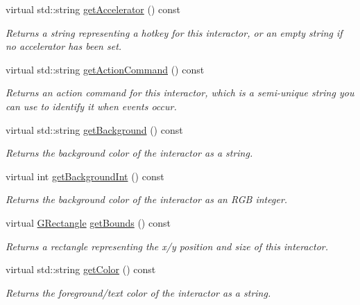 \begin{DoxyCompactItemize}
virtual std\+::string \mbox{\hyperlink{classGInteractor_a69f8d23ed8f207fbecad99960776e942}{get\+Accelerator}} () const
\begin{DoxyCompactList}\small\item\em Returns a string representing a hotkey for this interactor, or an empty string if no accelerator has been set. \end{DoxyCompactList}\item 
virtual std\+::string \mbox{\hyperlink{classGInteractor_a94eb4276000c4fdfb508ce9e6317a82a}{get\+Action\+Command}} () const
\begin{DoxyCompactList}\small\item\em Returns an action command for this interactor, which is a semi-\/unique string you can use to identify it when events occur. \end{DoxyCompactList}\item 
virtual std\+::string \mbox{\hyperlink{classGInteractor_a808e22cc1fdfbecf71ed8c64ef4600e0}{get\+Background}} () const
\begin{DoxyCompactList}\small\item\em Returns the background color of the interactor as a string. \end{DoxyCompactList}\item 
virtual int \mbox{\hyperlink{classGInteractor_a9e827257a55cb8cf4d9de2ec6bcfd7a0}{get\+Background\+Int}} () const
\begin{DoxyCompactList}\small\item\em Returns the background color of the interactor as an R\+GB integer. \end{DoxyCompactList}\item 
virtual \mbox{\hyperlink{structGRectangle}{G\+Rectangle}} \mbox{\hyperlink{classGInteractor_a29e6ac35a0b48f491a4c88194cc5da3b}{get\+Bounds}} () const
\begin{DoxyCompactList}\small\item\em Returns a rectangle representing the x/y position and size of this interactor. \end{DoxyCompactList}\item 
virtual std\+::string \mbox{\hyperlink{classGInteractor_aa061dfa488c31e18549d64363c1d0e34}{get\+Color}} () const
\begin{DoxyCompactList}\small\item\em Returns the foreground/text color of the interactor as a string. \end{DoxyCompactList}\item 

\end{DoxyCompactItemize}
